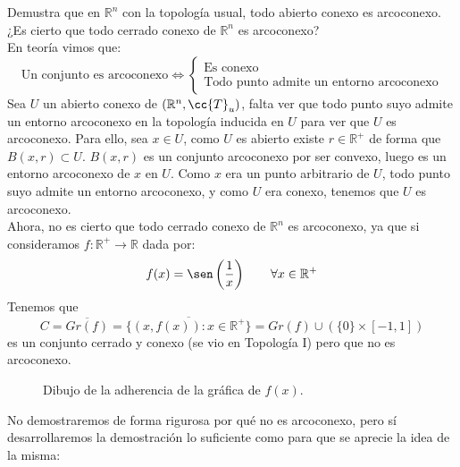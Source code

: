 \begin{ejercicio}
   Demustra que en $\mathbb{R}^n$  con la topología usual, todo abierto conexo es arcoconexo. ¿Es cierto que todo cerrado conexo de $\mathbb{R}^n$ es arcoconexo?\\

   \noindent
   En teoría vimos que:
   \begin{equation*}
       \text{Un conjunto es arcoconexo} \Longleftrightarrow \left\{\begin{array}{l}
           \text{Es conexo} \\
           \text{Todo punto admite un entorno arcoconexo}
       \end{array}\right.
   \end{equation*}
   Sea $U$ un abierto conexo de $(\mathbb{R}^n, \cc{T}_u)$, falta ver que todo punto suyo admite un entorno arcoconexo en la topología inducida en $U$ para ver que $U$ es arcoconexo. Para ello, sea $x\in U$, como $U$ es abierto existe $r\in \mathbb{R}^+$ de forma que $B(x,r)\subset U$. $B(x,r)$ es un conjunto arcoconexo por ser convexo, luego es un entorno arcoconexo de $x$ en $U$. Como $x$ era un punto arbitrario de $U$, todo punto suyo admite un entorno arcoconexo, y como $U$ era conexo, tenemos que $U$ es arcoconexo.\\

   \noindent
   Ahora, no es cierto que todo cerrado conexo de $\mathbb{R}^n$ es arcoconexo, ya que si consideramos $f:\mathbb{R}^+\to \mathbb{R}$ dada por:
   \begin{equation*}
       f(x) = \sen\left(\dfrac{1}{x}\right) \qquad \forall x\in \mathbb{R}^+
   \end{equation*}
   Tenemos que
   \begin{equation*}
       C = \overline{Gr(f)} = \overline{\{(x,f(x)) : x\in \mathbb{R}^+\}} = Gr(f) \cup (\{0\}\times [-1,1])
   \end{equation*}
   es un conjunto cerrado y conexo (se vio en Topología I) pero que no es arcoconexo.

   \begin{figure}[H]
       \centering
        \caption{Dibujo de la adherencia de la gráfica de $f(x)$.}
   \end{figure}
   No demostraremos de forma rigurosa por qué no es arcoconexo, pero sí desarrollaremos la demostración lo suficiente como para que se aprecie la idea de la misma:


\end{ejercicio}
